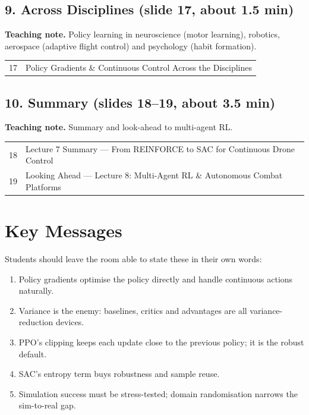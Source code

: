 \documentclass[11pt]{article}
\begin{document}
\subsection{9. Across Disciplines \normalfont\small\color{GreyN}(slide 17, about 1.5 min)}

\textbf{Teaching note.} Policy learning in neuroscience (motor learning), robotics, aerospace (adaptive flight control) and psychology (habit formation).

\begin{center}\small\renewcommand{\arraystretch}{1.1}\begin{tabularx}{\textwidth}{@{}r X@{}}17 & Policy Gradients \& Continuous Control Across the Disciplines\\\end{tabularx}\end{center}

\subsection{10. Summary \normalfont\small\color{GreyN}(slides 18--19, about 3.5 min)}

\textbf{Teaching note.} Summary and look-ahead to multi-agent RL.

\begin{center}\small\renewcommand{\arraystretch}{1.1}\begin{tabularx}{\textwidth}{@{}r X@{}}18 & Lecture 7 Summary --- From REINFORCE to SAC for Continuous Drone Control\\
19 & Looking Ahead --- Lecture 8: Multi-Agent RL \& Autonomous Combat Platforms\\\end{tabularx}\end{center}

\section{Key Messages}Students should leave the room able to state these in their own words:\begin{keypoint}\begin{enumerate}\item Policy gradients optimise the policy directly and handle continuous actions naturally.\item Variance is the enemy: baselines, critics and advantages are all variance-reduction devices.\item PPO's clipping keeps each update close to the previous policy; it is the robust default.\item SAC's entropy term buys robustness and sample reuse.\item Simulation success must be stress-tested; domain randomisation narrows the sim-to-real gap.\end{enumerate}\end{keypoint}
\end{document}

